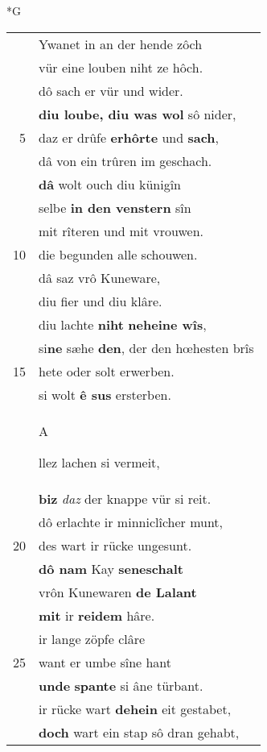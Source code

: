 \documentclass[8pt,a4paper,notitlepage]{article}
\begin{document}
\newpage
\begin{table}[ht]
\begin{minipage}[t]{0.5\linewidth}
\small
\begin{center}*G
\end{center}
\begin{tabular}{rl}
 & Ywanet in an der hende zôch\\ 
 & vür eine louben niht ze hôch.\\ 
 & dô sach er vür und wider.\\ 
 & \textbf{diu loube, diu was wol} sô nider,\\ 
5 & daz er drûfe \textbf{erhôrte} und \textbf{sach},\\ 
 & dâ von ein trûren im geschach.\\ 
 & \textbf{dâ} wolt ouch diu künigîn\\ 
 & selbe \textbf{in den venstern} sîn\\ 
 & mit rîteren und mit vrouwen.\\ 
10 & die begunden alle schouwen.\\ 
 & dâ saz vrô Kuneware,\\ 
 & diu fier und diu klâre.\\ 
 & diu lachte \textbf{niht} \textbf{neheine wîs},\\ 
 & si\textbf{ne} sæhe \textbf{den}, der den hœhesten brîs\\ 
15 & hete oder solt erwerben.\\ 
 & si wolt \textbf{ê sus} ersterben.\\ 
 & \begin{large}A\end{large}llez lachen si vermeit,\\ 
 & \textbf{biz} \textit{daz} der knappe vür si reit.\\ 
 & dô erlachte ir minniclîcher munt,\\ 
20 & des wart ir rücke ungesunt.\\ 
 & \textbf{dô nam} Kay \textbf{seneschalt}\\ 
 & vrôn Kunewaren \textbf{de Lalant}\\ 
 & \textbf{mit} ir \textbf{reidem} hâre.\\ 
 & ir lange zöpfe clâre\\ 
25 & want er umbe sîne hant\\ 
 & \textbf{unde} \textbf{spante} si âne türbant.\\ 
 & ir rücke wart \textbf{dehein} eit gestabet,\\ 
 & \textbf{doch} wart ein stap sô dran gehabt,\\ 

\end{tabular}
\end{minipage}
\end{table}
\end{document}
